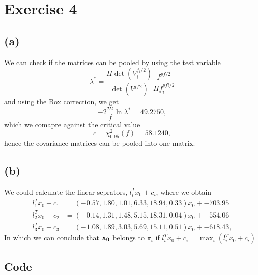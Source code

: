 
\section*{Exercise 4}
\label{sec:exercise-4}

\subsection*{(a)}
\label{sec:a-3}

We can check if the matrices can be pooled by using the test variable
\begin{equation*}
  \lambda^* = \frac{\Pi \det(V_i ^{f_i/2})}{\det(V^{f/2})}
  \frac{f^{pf/2}}{\Pi f_i ^{pfi/2}}
\end{equation*}
and using the Box correction, we get
\begin{equation*}
  -2  \frac{m}{f} \ln \lambda^* = 49.2750,
\end{equation*}
which we comapre against the critical value
\begin{equation*}
  c = \chi^2_{0.95}(f) = 58.1240,
\end{equation*}
hence the covariance matrices can be pooled into one matrix.

\subsection*{(b)}
\label{sec:b-3}

We could calculate the linear seprators, $ l_i^T x_0 + c_i$, where
we obtain
\begin{align*}
l_1^T x_0 + c_1 &= (-0.57, 1.80, 1.01, 6.33, 18.94, 0.33)x_0 + -703.95 \\ 
l_2^T x_0 + c_2 &= (-0.14, 1.31, 1.48, 5.15, 18.31, 0.04)x_0 + -554.06 \\ 
l_3^T x_0 + c_3 &= (-1.08, 1.89, 3.03, 5.69, 15.11, 0.51)x_0 + -618.43,
\end{align*}
In which we can conclude that ${\bf x_0}$ belongs to  $\pi_i$ if $
  l_i^T x_0 + c_i = \max_i \left(   l_i^T x_0 + c_i\right)
$



\subsection*{Code}
\label{sec:code}




